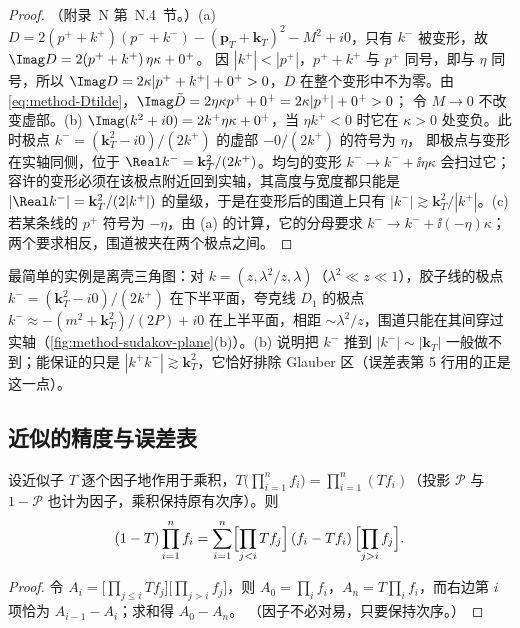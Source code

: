\begin{proof}
（附录~N 第~N.4~节。）(a) $D=2(p^++k^+)(p^-+k^-)-(\mathbf p_T+\mathbf k_T)^2-M^2+i0$，只有 $k^-$ 被变形，故 $\Imag D=2(p^++k^+)\,\eta\kappa+0^+$。
因 $|k^+|<|p^+|$，$p^++k^+$ 与 $p^+$ 同号，即与 $\eta$ 同号，所以 $\Imag D=2\kappa|p^++k^+|+0^+>0$，$D$ 在整个变形中不为零。由\cref{eq:method-Dtilde}，$\Imag\tilde D=2\eta\kappa p^++0^+=2\kappa|p^+|+0^+>0$；
令 $M\to0$ 不改变虚部。(b) $\Imag(k^2+i0)=2k^+\eta\kappa+0^+$，当 $\eta k^+<0$ 时它在 $\kappa>0$ 处变负。此时极点 $k^-=(\mathbf k_T^2-i0)/(2k^+)$ 的虚部 $-0/(2k^+)$ 的符号为 $\eta$，
即极点与变形在实轴同侧，位于 $\Real k^-=\mathbf k_T^2/(2k^+)$。均匀的变形 $k^-\to k^-+\ii\eta\kappa$ 会扫过它；容许的变形必须在该极点附近回到实轴，其高度与宽度都只能是
$|\Real k^-|=\mathbf k_T^2/(2|k^+|)$ 的量级，于是在变形后的围道上只有 $|k^-|\gtrsim\mathbf k_T^2/|k^+|$。(c) 若某条线的 $p^+$ 符号为 $-\eta$，由 (a) 的计算，它的分母要求 $k^-\to k^-+\ii(-\eta)\kappa$；
两个要求相反，围道被夹在两个极点之间。
\end{proof}

最简单的实例是离壳三角图：对 $k=(z,\lambda^2/z,\lambda)$（$\lambda^2\ll z\ll1$），胶子线的极点 $k^-=(\mathbf k_T^2-i0)/(2k^+)$ 在下半平面，夸克线 $D_1$ 的极点 $k^-\approx-(m^2+\mathbf k_T^2)/(2P)+i0$
在上半平面，相距 $\sim\lambda^2/z$，围道只能在其间穿过实轴（\cref{fig:method-sudakov-plane}(b)）。(b) 说明把 $k^-$ 推到 $|k^-|\sim|\mathbf k_T|$ 一般做不到；能保证的只是
$|k^+k^-|\gtrsim\mathbf k_T^2$，它恰好排除 Glauber 区（误差表第 5 行用的正是这一点）。

\subsection{近似的精度与误差表}

\begin{lemma}[乘积的伸缩恒等式]\label{lem:method-telescoping}
设近似子 $T$ 逐个因子地作用于乘积，$T\bigl(\prod_{i=1}^nf_i\bigr)=\prod_{i=1}^n(Tf_i)$（投影 $\mathcal P$ 与 $1-\mathcal P$ 也计为因子，乘积保持原有次序）。则
\begin{equation}\label{eq:method-telescoping}
(1-T)\prod_{i=1}^nf_i=\sum_{i=1}^n\Bigl[\prod_{j<i}Tf_j\Bigr]\,(f_i-Tf_i)\,\Bigl[\prod_{j>i}f_j\Bigr].
\end{equation}
\end{lemma}

\begin{proof}
令 $A_i=\bigl[\prod_{j\le i}Tf_j\bigr]\bigl[\prod_{j>i}f_j\bigr]$，则 $A_0=\prod_if_i$，$A_n=T\prod_if_i$，而右边第 $i$ 项恰为 $A_{i-1}-A_i$；求和得 $A_0-A_n$。
（因子不必对易，只要保持次序。）
\end{proof}

